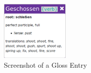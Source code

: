 \begin{figure}
	\caption{Screenshot of a Gloss Entry}
	\label{fig:gloss}
	\begin{center}
	\includegraphics[width=0.3\textwidth]{Graphics/Gloss}
\end{center}
\end{figure}